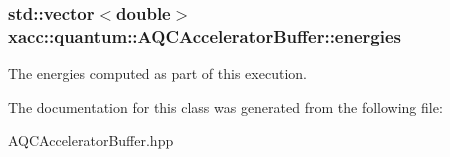 \subsubsection[{\texorpdfstring{energies}{energies}}]{\setlength{\rightskip}{0pt plus 5cm}std\+::vector$<$double$>$ xacc\+::quantum\+::\+A\+Q\+C\+Accelerator\+Buffer\+::energies\hspace{0.3cm}{\ttfamily [protected]}}\hypertarget{a00022_abe6d781724e197df449d8dfcde60e1a4}{}\label{a00022_abe6d781724e197df449d8dfcde60e1a4}
The energies computed as part of this execution. 

The documentation for this class was generated from the following file\+:\begin{DoxyCompactItemize}
\item 
A\+Q\+C\+Accelerator\+Buffer.\+hpp\end{DoxyCompactItemize}
